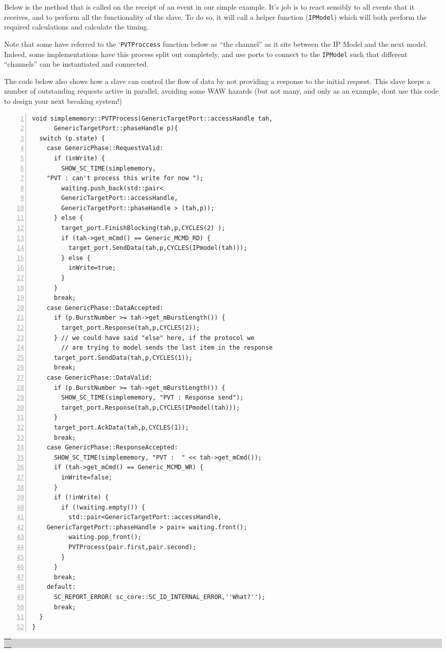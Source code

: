 \documentclass[12pt,oneside]{gsbook}
\def\example#1{\begin{center}\colorbox{lightgrey}{\begin{tabular}{|p{0.6\paperwidth}|}\hline\\#1\\ \\ \hline\end{tabular}}\end{center}}
\newenvironment{exampleenv}{\begin{lrbox}{\examplebox}\begin{minipage}{0.6\paperwidth}}{\end{minipage}\end{lrbox}\example{\usebox{\examplebox}}}
\begin{document}
Below is the method that is called on the receipt of an event in our
simple example. It's job is to react sensibly to all events that it
receives, and to perform all the functionality of the slave. To do so,
it will call a helper function ({\tt IPModel}) which will both perform
the required calculations and calculate the timing.

Note that some have referred to the `{\tt PVTProccess} function below
as ``the channel'' as it sits between the IP Model and the next
model. Indeed, some implementations have this process split out
completely, and use ports to connect to the {\tt IPModel} such that
different ``channels'' can be instantiated and connected.

The code below also shows how a slave can control the flow of data by
not providing a response to the initial request. This slave keeps a
number of outstanding requests active in parallel, avoiding some WAW
hazards (but not many, and only as an example, dont use this code to
design your next breaking system!)

\begin{exampleenv}
\begin{Verbatim}[numbers=left,fontsize=\small]
void simplememory::PVTProcess(GenericTargetPort::accessHandle tah,
	  GenericTargetPort::phaseHandle p){
  switch (p.state) {
    case GenericPhase::RequestValid:
      if (inWrite) {
        SHOW_SC_TIME(simplememory, 
	"PVT : can't process this write for now ");
        waiting.push_back(std::pair<
		GenericTargetPort::accessHandle,
		GenericTargetPort::phaseHandle > (tah,p));
      } else {
        target_port.FinishBlocking(tah,p,CYCLES(2) );
        if (tah->get_mCmd() == Generic_MCMD_RD) {
          target_port.SendData(tah,p,CYCLES(IPmodel(tah)));
        } else {
          inWrite=true;
        }
      }
      break;
    case GenericPhase::DataAccepted:
      if (p.BurstNumber >= tah->get_mBurstLength()) {
        target_port.Response(tah,p,CYCLES(2));
      } // we could have said "else" here, if the protocol we  
        // are trying to model sends the last item in the response
      target_port.SendData(tah,p,CYCLES(1));
      break;
    case GenericPhase::DataValid:
      if (p.BurstNumber >= tah->get_mBurstLength()) {
        SHOW_SC_TIME(simplememory, "PVT : Response send");
        target_port.Response(tah,p,CYCLES(IPmodel(tah)));
      } 
      target_port.AckData(tah,p,CYCLES(1));
      break;
    case GenericPhase::ResponseAccepted:
      SHOW_SC_TIME(simplememory, "PVT :  " << tah->get_mCmd());
      if (tah->get_mCmd() == Generic_MCMD_WR) {
        inWrite=false;
      }
      if (!inWrite) {
        if (!waiting.empty()) {
          std::pair<GenericTargetPort::accessHandle, 
	GenericTargetPort::phaseHandle > pair= waiting.front();
          waiting.pop_front();
          PVTProcess(pair.first,pair.second);
        }
      }
      break;
    default:
      SC_REPORT_ERROR( sc_core::SC_ID_INTERNAL_ERROR,''What?'');
      break;
  }
}
\end{Verbatim}
\end{exampleenv} 
\end{document}
